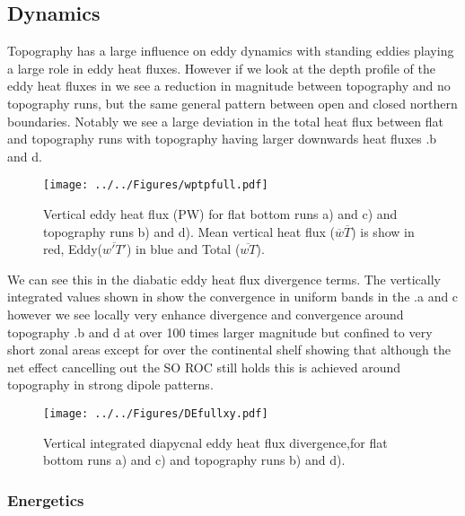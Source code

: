 \subsection{Dynamics}

Topography has a large influence on eddy dynamics with standing eddies playing a large role in eddy heat fluxes. However if we look at the depth profile of the eddy heat fluxes in  we see a reduction in magnitude between topography and no topography runs, but the same general pattern between open and closed northern boundaries. Notably we see a large deviation in the total heat flux between flat and topography runs with topography having larger downwards heat fluxes .b and d.
\begin{figure}[H]
\noindent \texttt{[image: ../../Figures/wptpfull.pdf]} 
\caption{Vertical eddy heat flux (PW) for flat bottom runs a) and c) and topography runs b) and d). Mean vertical heat flux ($\overline{w}\overline{T}$) is show in red, Eddy($\overline{w'T'}$)  in blue and Total ($\overline{wT}$). }
\label{fig:wptpfull}
\end{figure}
We can see this in the diabatic eddy heat flux divergence terms. The vertically integrated values shown in  show the convergence in uniform bands in the .a and c however we see locally very enhance divergence and convergence around topography .b and d at over 100 times larger magnitude but confined to very short zonal areas except for over the continental shelf showing that although the net effect cancelling out the SO ROC still holds this is achieved around topography in strong dipole patterns.
\begin{figure}[H]
\noindent \texttt{[image: ../../Figures/DEfullxy.pdf]} 
\caption{Vertical integrated diapycnal eddy heat flux divergence,for flat bottom runs a) and c) and topography runs b) and d).}
\label{fig:DExy}
\end{figure}

\subsubsection*{Energetics}

